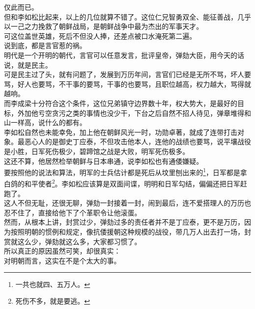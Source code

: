 \begin{multicols}{\theparacolNo}
仅此而已。\\

但和李如松比起来，以上的几位就算不错了。这位仁兄智勇双全、能征善战，几乎以一己之力挽救了朝鲜战局，是朝鲜战争中最为杰出的军事天才。\\

可这位盖世英雄，死后不但没人捧，还差点被口水淹死第二遍。\\

说到底，都是言官惹的祸。\\

明代是一个开明的朝代，言官可以任意发言，批评皇帝，弹劾大臣，用今天的话说，就是民主。\\

可是民主过了头，就有问题了，发展到万历年间，言官们已经是无所不骂，坏人要骂，好人也要骂，不干事的要骂，干事的也要骂，且职位越高，权力越大，骂得就越响。\\

而李成梁十分符合这个条件，这位兄弟镇守边界数十年，权大势大，是最好的目标，外加他亏空贪污之类的事情也没少干，下台之后自然不招人待见，弹章堆得和山一样高，说什么的都有。\\

李如松自然也未能幸免，加上他在朝鲜风光一时，功勋卓著，就成了连带打击对象。最恶心人的是御史丁应泰，不但攻击他本人，连他的战绩也要骂，说平壤战役是小胜，日军死伤极少，碧蹄馆之战是大败，明军死伤极多。\\

这还不算，他居然检举朝鲜与日本串通，说李如松也有通倭嫌疑。\\

要按照他的说法和算法，明军的士兵估计都是死后从坟里刨出来的\footnote{一共也就四、五万人。}，日军都是拿白鸽的和平使者\footnote{死伤不多，就是要逃。}。李如松应该算是双面间谍，明明和日军勾结，偏偏还把日军赶跑了。\\

这人不但无耻，还很无聊，弹劾一封接着一封，闹到最后，连不爱搭理人的万历也忍不住了，直接给他下了个革职令让他滚蛋。\\

然而，从根本上讲，封赏过少，弹劾过多的责任者并不是丁应泰，更不是万历，因为按照明朝的惯例和规定，像抗倭援朝这种规模的战役，带几万人出去打一场，封赏就这么少，弹劾就这么多，大家都习惯了。\\

所以真正的原因虽然可笑，却很真实：\\

对明朝而言，这实在不是个太大的事。\\


\end{multicols}
